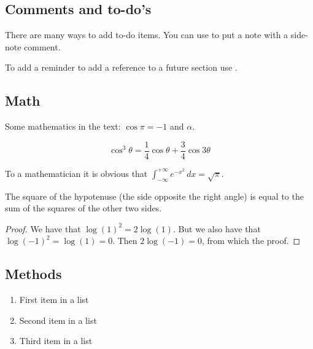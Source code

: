 \subsection{Comments and to-do's}
There are many ways to add to-do items.
You can use  to put a note with a side-note comment.

To add a reminder to add a reference to a future section use
.



\subsection{Math}

Some mathematics in the text: $\cos\pi=-1$ and $\alpha$.

\begin{equation}
\cos^3 \theta =\frac{1}{4}\cos\theta+\frac{3}{4}\cos 3\theta
\label{eq:refname2}
\end{equation}

\lipsum[5] %

\begin{definition}[Gauss]
To a mathematician it is obvious that
$\int_{-\infty}^{+\infty}
e^{-x^2}\,dx=\sqrt{\pi}$.
\end{definition}

\begin{theorem}[Pythagoras]
The square of the hypotenuse (the side opposite the right angle) is equal to the sum of the squares of the other two sides.
\end{theorem}

\begin{proof}
We have that $\log(1)^2 = 2\log(1)$.
But we also have that $\log(-1)^2=\log(1)=0$.
Then $2\log(-1)=0$, from which the proof.
\end{proof}

\subsection{Methods}

\lipsum[5] %

\begin{enumerate}[noitemsep] %
\item First item in a list
\item Second item in a list
\item Third item in a list
\end{enumerate}

